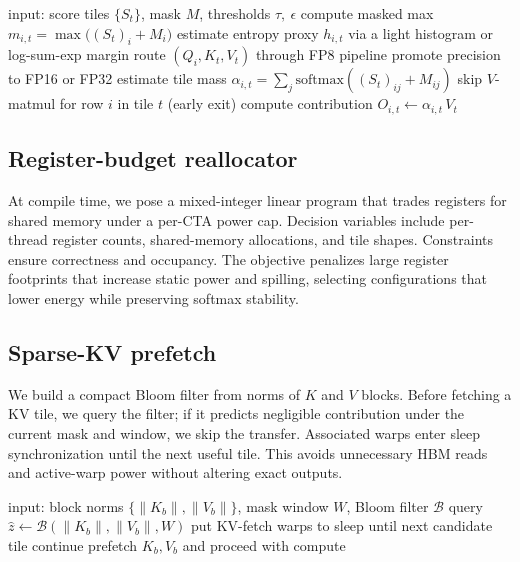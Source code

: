 \documentclass{article}
\begin{document}
\begin{algorithm}[H]
\caption{Entropy-guided mixed-precision routing with early exits}
\begin{algorithmic}[1]
\State input: score tiles \(\{S_t\}\), mask \(M\), thresholds \(\tau,\ \epsilon\)
  \State compute masked max \(m_{i,t}=\max\big((S_t)_i + M_i\big)\)
  \State estimate entropy proxy \(h_{i,t}\) via a light histogram or log-sum-exp margin
    \State route \((Q_i,K_t,V_t)\) through FP8 pipeline
    \State promote precision to FP16 or FP32
  \EndIf
  \State estimate tile mass \(\alpha_{i,t}=\sum_j \mathrm{softmax}((S_t)_{ij}+M_{ij})\)
    \State skip \(V\)-matmul for row \(i\) in tile \(t\) (early exit)
  \Else
    \State compute contribution \(O_{i,t} \leftarrow \alpha_{i,t}\,V_t\)
  \EndIf
\EndFor
\end{algorithmic}
\end{algorithm}

\subsection{Register-budget reallocator}
At compile time, we pose a mixed-integer linear program that trades registers for shared memory under a per-CTA power cap. Decision variables include per-thread register counts, shared-memory allocations, and tile shapes. Constraints ensure correctness and occupancy. The objective penalizes large register footprints that increase static power and spilling, selecting configurations that lower energy while preserving softmax stability.

\subsection{Sparse-KV prefetch}
We build a compact Bloom filter from norms of \(K\) and \(V\) blocks. Before fetching a KV tile, we query the filter; if it predicts negligible contribution under the current mask and window, we skip the transfer. Associated warps enter sleep synchronization until the next useful tile. This avoids unnecessary HBM reads and active-warp power without altering exact outputs.

\begin{algorithm}[H]
\caption{Sparse-KV prefetch and warp sleeping}
\begin{algorithmic}[1]
\State input: block norms \(\{\|K_b\|,\|V_b\|\}\), mask window \(W\), Bloom filter \(\mathcal{B}\)
  \State query \(\hat{z} \leftarrow \mathcal{B}(\|K_b\|,\|V_b\|,W)\)  
    \State put KV-fetch warps to sleep until next candidate tile
    \State continue
  \Else
    \State prefetch \(K_b, V_b\) and proceed with compute
  \EndIf
\EndFor
\end{algorithmic}
\end{algorithm}
\end{document}
